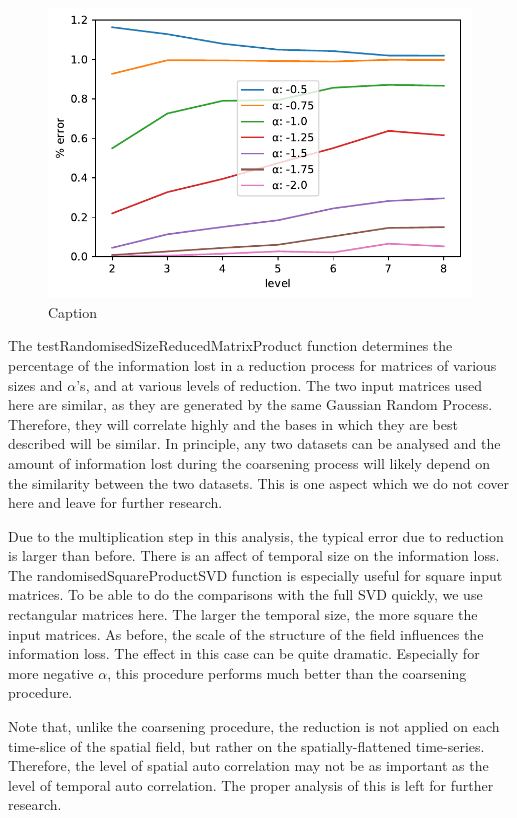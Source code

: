 \documentclass{acm_proc_article-sp}
\begin{document}
\begin{figure}[h]
\begin{center}
\includegraphics[width=0.8\columnwidth]{Results/plotRandomisedSizeReducedMatrixProduct.pdf}
\caption[Small caption]{Caption}
\label{fig:plotRandomisedSizeReducedMatrixProduct}
\end{center}
\end{figure}
The testRandomisedSizeReducedMatrixProduct function determines the percentage of the information lost in a reduction process for matrices of various sizes and $\alpha$'s, and at various levels of reduction. The two input matrices used here are similar, as they are generated by the same Gaussian Random Process. Therefore, they will correlate highly and the bases in which they are best described will be similar. In principle, any two datasets can be analysed and the amount of information lost during the coarsening process will likely depend on the similarity between the two datasets. This is one aspect which we do not cover here and leave for further research.

Due to the multiplication step in this analysis, the typical error due to reduction is larger than before. There is an affect of temporal size on the information loss. The randomisedSquareProductSVD function is especially useful for square input matrices. To be able to do the comparisons with the full SVD quickly, we use rectangular matrices here. The larger the temporal size, the more square the input matrices. As before, the scale of the structure of the field influences the information loss. The effect in this case can be quite dramatic. Especially for more negative $\alpha$, this procedure performs much better than the coarsening procedure.

Note that, unlike the coarsening procedure, the reduction is not applied on each time-slice of the spatial field, but rather on the spatially-flattened time-series. Therefore, the level of spatial auto correlation may not be as important as the level of temporal auto correlation. The proper analysis of this is left for further research.
\end{document}
